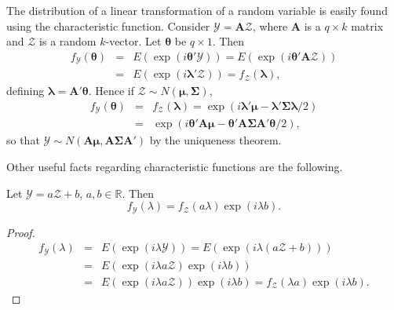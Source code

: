 \begin{example}\label{ex:4.12}
The distribution of a linear transformation of a random
variable is easily found using the characteristic function. Consider $\mathcal{Y} = \mathbf{A}\mathcal{Z}$, where $\mathbf{A}$ is a $q \times k$ matrix and $\mathcal{Z}$ is a random $k$-vector. Let $\boldsymbol{\theta}$ be $q \times 1$.
Then
\begin{eqnarray*}
f_{\mathcal{Y}}(\boldsymbol{\theta}) &=& E(\exp(i\boldsymbol{\theta}'\mathcal{Y})) = E(\exp(i\boldsymbol{\theta}'\mathbf{A}\mathcal{Z}))\\
&=& E(\exp(i\boldsymbol{\lambda}'\mathcal{Z})) = f_{\mathcal{Z}}(\boldsymbol{\lambda}),
\end{eqnarray*}
defining $\boldsymbol{\lambda} = \mathbf{A}'\boldsymbol{\theta}$. Hence if $\mathcal{Z} \sim N(\boldsymbol{\mu}, \boldsymbol{\Sigma})$,
\begin{eqnarray*}
f_{\mathcal{Y}}(\boldsymbol{\theta}) &=& f_{\mathcal{Z}}(\boldsymbol{\lambda}) = \exp(i\boldsymbol{\lambda}'\boldsymbol{\mu} - \boldsymbol{\lambda}'\boldsymbol{\Sigma}\boldsymbol{\lambda}/2)\\
&=& \exp(i\boldsymbol{\theta}'\mathbf{A}\boldsymbol{\mu} - \boldsymbol{\theta}'\mathbf{A}\boldsymbol{\Sigma}\mathbf{A}'\boldsymbol{\theta}/2),
\end{eqnarray*}
so that $\mathcal{Y} \sim N(\mathbf{A}\boldsymbol{\mu}, \mathbf{A}\boldsymbol{\Sigma}\mathbf{A}')$ by the uniqueness theorem.
\end{example}

Other useful facts regarding characteristic functions are the following.

\begin{proposition}\label{prop:4.13}
Let $\mathcal{Y} = a\mathcal{Z} + b$, $a, b \in \mathbb{R}$. Then
\[
f_{\mathcal{Y}}(\lambda) = f_{\mathcal{Z}}(a\lambda)\exp(i\lambda b).
\]
\end{proposition}

\begin{proof}
\begin{eqnarray*}
f_{\mathcal{Y}}(\lambda) &=& E(\exp(i\lambda\mathcal{Y})) = E(\exp(i\lambda(a\mathcal{Z} + b)))\\
&=& E(\exp(i\lambda a\mathcal{Z})\exp(i\lambda b))\\
&=& E(\exp(i\lambda a\mathcal{Z}))\exp(i\lambda b) = f_{\mathcal{Z}}(\lambda a)\exp(i\lambda b).
\end{eqnarray*}
\end{proof}

